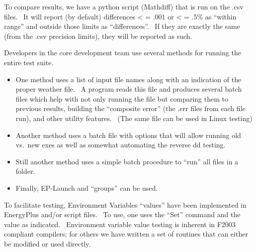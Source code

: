 To compare results, we have a python script (Mathdiff) that is run on the .csv files.~ It will report (by default) differences \textless{} = .001 or \textless{} = .5\% as ``within range'' and outside those limits as ``differences''.~ If they are exactly the same (from the .csv precision limits), they will be reported as such.

Developers in the core development team use several methods for running the entire test suite.

\begin{itemize}
\item
  One method uses a list of input file names along with an indication of the proper weather file.~ A program reads this file and produces several batch files which help with not only running the file but comparing them to previous results, building the ``composite error'' (the .err files from each file run), and other utility features.~ (The same file can be used in Linux testing)
\item
  Another method uses a batch file with options that will allow running old vs.~new exes as well as somewhat automating the reverse dd testing.
\item
  Still another method uses a simple batch procedure to ``run'' all files in a folder.
\item
  Finally, EP-Launch and ``groups'' can be used.
\end{itemize}

To facilitate testing, Environment Variables ``values'' have been implemented in EnergyPlus and/or script files.~ To use, one uses the ``Set'' command and the value as indicated.~ Environment variable value testing is inherent in F2003 compliant compilers; for others we have written a set of routines that can either be modified or used directly.
